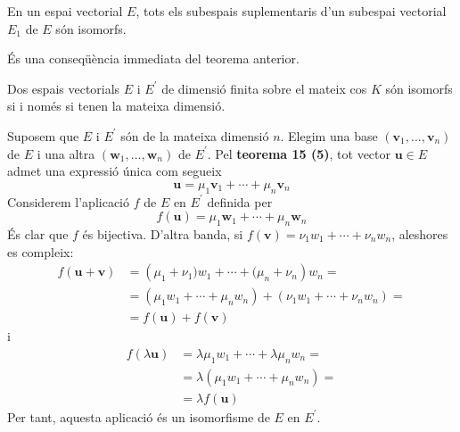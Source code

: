 \begin{corollari}
En un espai vectorial $E$, tots els subespais suplementaris
d’un subespai vectorial $E_{1}$ de $E$ són isomorfs.

\end{corollari}
\begin{prova}
És una conseqüència immediata del teorema anterior.
\end{prova}

\begin{teorema}
Dos espais vectorials $E$ i $E^{\prime }$ de dimensió finita sobre
el mateix cos $K$ són isomorfs si i només si tenen la mateixa dimensió.

\end{teorema}
\begin{prova}
Suposem que $E$ i $E^{\prime }$ són de la mateixa dimensió $n$. Elegim una base $(\mathbf{v}_{1},...,\mathbf{v}_{n})$ de $%
E$ i una altra $(\mathbf{w}_{1},...,\mathbf{w}_{n})$ de $E%
^{\prime }$. Pel \textbf{teorema 15 (5)}, tot vector $\mathbf{u}\in 
E$ admet una expressió única com segueix%
\begin{equation*}
\mathbf{u}=\mu _{1}\mathbf{v}_{1}+\cdots +\mu _{n}\mathbf{v}_{n}
\end{equation*}%
Considerem l’aplicació $f$ de $E$ en $E^{\prime }$
definida per%
\begin{equation*}
f(\mathbf{u})=\mu _{1}\mathbf{w}_{1}+\cdots +\mu _{n}\mathbf{w}_{n}
\end{equation*}%
És clar que $f$ és bijectiva. D’altra banda, si $f(\mathbf{v})=\nu
_{1}w_{1}+\cdots +\nu _{n}w_{n}$, aleshores es compleix:%
\begin{align*}
f(\mathbf{u}+\mathbf{v}) &=\left( \mu _{1}+\nu _{1})w_{1}+\cdots +(\mu
_{n}+\nu _{n}\right) w_{n}= \\
&=(\mu _{1}w_{1}+\cdots +\mu _{n}w_{n})+(\nu _{1}w_{1}+\cdots +\nu
_{n}w_{n})= \\
&=f(\mathbf{u})+f(\mathbf{v})
\end{align*}%
i%
\begin{align*}
f(\lambda \mathbf{u}) &=\lambda \mu _{1}w_{1}+\cdots +\lambda \mu _{n}w_{n}=
\\
&=\lambda (\mu _{1}w_{1}+\cdots +\mu _{n}w_{n})= \\
&=\lambda f(\mathbf{u})
\end{align*}%
Per tant, aquesta aplicació és un isomorfisme de $E$ en $E^{\prime }$.


\end{prova}
